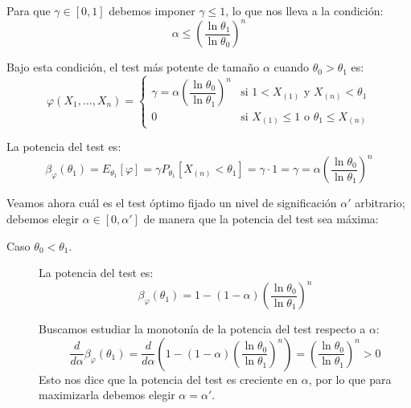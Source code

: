 \begin{ejercicio}
\begin{description}
\begin{description}
            Para que $\gamma \in [0,1]$ debemos imponer $\gamma \leq 1$, lo que nos lleva a la condición:
            \begin{equation*}
                \alpha \leq \left(\frac{\ln \theta_1}{\ln \theta_0}\right)^n
            \end{equation*}

            Bajo esta condición, el test más potente de tamaño $\alpha$ cuando $\theta_0 > \theta_1$ es:
            \begin{equation*}
                \varphi(X_1, \ldots, X_n) = \left\{\begin{array}{ll}
                    \gamma = \alpha\left(\dfrac{\ln \theta_0}{\ln \theta_1}\right)^n & \text{si\ } 1 < X_{(1)} \text{\ y\ } X_{(n)} < \theta_1 \\[8pt]
                    0 & \text{si\ } X_{(1)} \leq 1 \text{\ o\ } \theta_1 \leq X_{(n)}
                \end{array}\right.
            \end{equation*}

            La potencia del test es:
            \begin{equation*}
                \beta_\varphi(\theta_1) = E_{\theta_1}[\varphi] = \gamma P_{\theta_1}[X_{(n)} < \theta_1] = \gamma \cdot 1 = \gamma = \alpha\left(\frac{\ln \theta_0}{\ln \theta_1}\right)^n
            \end{equation*}
        \end{description}
    \end{description}

    Veamos ahora cuál es el test óptimo fijado un nivel de significación $\alpha'$ arbitrario; debemos elegir $\alpha \in [0,\alpha']$ de manera que la potencia del test sea máxima:
    \begin{description}
        \item[Caso $\theta_0 < \theta_1$.] La potencia del test es:
        \begin{equation*}
            \beta_\varphi(\theta_1) = 1 - (1-\alpha)\left(\frac{\ln \theta_0}{\ln \theta_1}\right)^n
        \end{equation*}

        Buscamos estudiar la monotonía de la potencia del test respecto a $\alpha$:
        \begin{equation*}
            \frac{d}{d\alpha}\beta_\varphi(\theta_1) = \frac{d}{d\alpha}\left(1 - (1-\alpha)\left(\frac{\ln \theta_0}{\ln \theta_1}\right)^n\right) = \left(\frac{\ln \theta_0}{\ln \theta_1}\right)^n > 0
        \end{equation*}
        Esto nos dice que la potencia del test es creciente en $\alpha$, por lo que para maximizarla debemos elegir $\alpha = \alpha'$.


\end{description}
\end{ejercicio}
